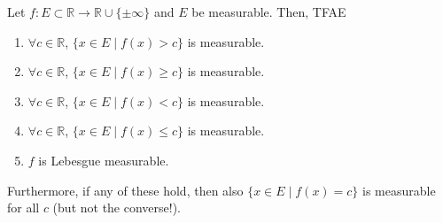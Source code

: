   \begin{theorem}
    \label{thm:measurable-functions-on-real-line}
    Let $f: E \subset \mathbb{R} \to \mathbb{R} \cup \{ \pm \infty\}$ and $E$ be measurable. Then, TFAE 
    \begin{enumerate} 
      \item $\forall c \in \mathbb{R}$, $\{x \in E \mid f(x) > c\}$ is measurable. 
      \item $\forall c \in \mathbb{R}$, $\{x \in E \mid f(x) \geq c\}$ is measurable. 
      \item $\forall c \in \mathbb{R}$, $\{x \in E \mid f(x) < c\}$ is measurable. 
      \item $\forall c \in \mathbb{R}$, $\{x \in E \mid f(x) \leq c\}$ is measurable. 
      \item $f$ is Lebesgue measurable. 
    \end{enumerate}
    Furthermore, if any of these hold, then also $\{x \in E \mid f(x) = c \}$ is measurable for all $c$ (but not the converse!). 
  \end{theorem} 
